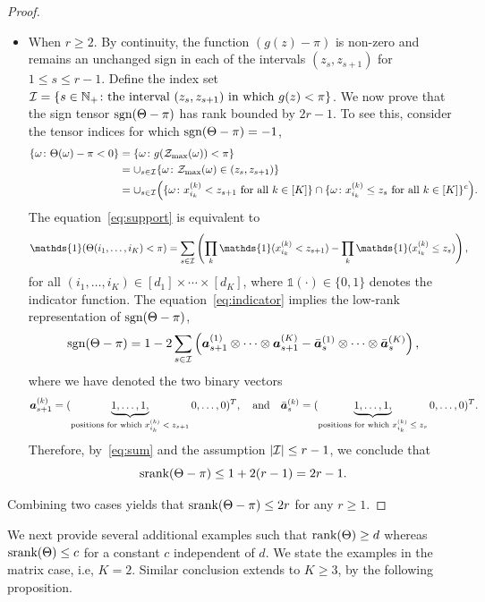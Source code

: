 \documentclass[11pt]{article}
\theoremstyle{plain}
\theoremstyle{definition}
\newcommand*{\KeepStyleUnderBrace}[1]{%
  \mathop{%
    \mathchoice
    {\underbrace{\displaystyle#1}}%
    {\underbrace{\textstyle#1}}%
    {\underbrace{\scriptstyle#1}}%
    {\underbrace{\scriptscriptstyle#1}}%
  }\limits
}
\def\sign{\textup{sgn}}
\def\srank{\textup{srank}}
\def\rank{\textup{rank}}
\begin{document}
\begin{proof}
\begin{itemize}[leftmargin=*,topsep=0pt,itemsep=-1ex,partopsep=1ex,parsep=1ex]
\item When $r\geq 2$.   By continuity, the function $(g(z)-\pi)$ is non-zero and remains an unchanged sign in each of the intervals $(z_s, z_{s+1})$ for $1\leq s\leq r-1$. Define the index set $\mathcal{I}=\{s\in\mathbb{N}_{+}\colon \text{the interval $(z_s, z_{s+1})$ in which $g(z)<\pi$}\}$. 
We now prove that the sign tensor $\sign(\Theta-\pi)$ has rank bounded by $2r-1$. To see this, consider the tensor indices for which $\sign(\Theta-\pi)=-1$,
\begin{align}\label{eq:support}
\{\omega\colon \Theta(\omega)-\pi <0 \} & = \{\omega \colon g(\mathcal{Z}_{\max}(\omega))<\pi\} \notag \\
&=\cup_{s\in \mathcal{I}} \{\omega\colon \mathcal{Z}_{\max}(\omega)\in(z_s,z_{s+1})\}\notag\\
&=\cup_{s\in \mathcal{I}}\Big( \{\omega\colon \text{$x^{(k)}_{i_k}< z_{s+1}$ for all $k\in[K]$}\}\cap \{\omega\colon \text{$x^{(k)}_{i_k}\leq z_{s}$ for all $k\in[K]$}\}^c\Big).
\end{align}
The equation~\eqref{eq:support} is equivalent to 
\begin{align}\label{eq:indicator}
\mathds{1}(\Theta(i_1,\ldots,i_K)< \pi)&
=\sum_{s\in \tI}\left( \prod_k \mathds{1}(x^{(k)}_{i_k}< z_{s+1}) - \prod_k \mathds{1}(x^{(k)}_{i_k}\leq z_{s})\right),
\end{align}
for all $(i_1,\ldots,i_K)\in[d_1]\times \cdots\times[d_K]$, where $\mathds{1}(\cdot)\in\{0,1\}$ denotes the indicator function. The equation~\eqref{eq:indicator} implies the low-rank representation of $\sign(\Theta-\pi)$,
\begin{equation}\label{eq:sum}
\sign(\Theta-\pi)=1-2\sum_{s\in \tI } \left(\ma^{(1)}_{s+1}\otimes\cdots\otimes \ma^{(K)}_{s+1} - \bar \ma^{(1)}_s\otimes\cdots\otimes \bar \ma^{(K)}_s\right),
\end{equation}
where we have denoted the two binary vectors 
\[
\ma^{(k)}_{s+1}=(\KeepStyleUnderBrace{1,\ldots,1,}_{\text{positions for which $x_{i_k}^{(k)}<z_{s+1}$}}0,\ldots, 0)^T,\quad \text{and}\quad
\bar \ma^{(k)}_s=(\KeepStyleUnderBrace{1,\ldots,1,}_{\text{positions for which $x_{i_k}^{(k)}\leq z_{s}$}}0,\ldots, 0)^T.
\]
Therefore, by~\eqref{eq:sum} and the assumption $|\mathcal{I}|\leq r-1$, we conclude that 
\[
\srank(\Theta-\pi)\leq 1+2(r-1)=2r-1.
\]
\end{itemize}
Combining two cases yields that $\srank(\Theta-\pi)\leq 2r$ for any $r\geq 1$.
\end{proof}

We next provide several additional examples such that $\rank(\Theta)\geq d$ whereas $\srank(\Theta)\leq c$ for a constant $c$ independent of $d$. We state the examples in the matrix case, i.e, $K=2$. Similar conclusion extends to $K\geq 3$, by the following proposition. \\
\end{document}

